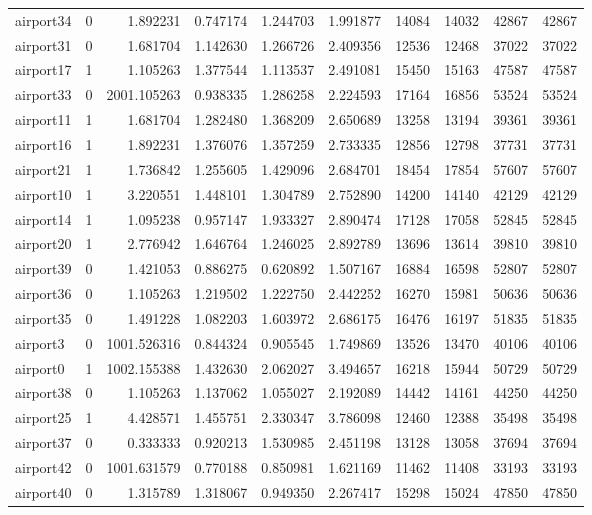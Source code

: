 \begin{longtable}{|l|r|r|r|r|r|r|r|r|r|}
airport34 & 0 & 1.892231 & 0.747174 & 1.244703 & 1.991877 & 14084 & 14032 & 42867 & 42867 \\
airport31 & 0 & 1.681704 & 1.142630 & 1.266726 & 2.409356 & 12536 & 12468 & 37022 & 37022 \\
airport17 & 1 & 1.105263 & 1.377544 & 1.113537 & 2.491081 & 15450 & 15163 & 47587 & 47587 \\
airport33 & 0 & 2001.105263 & 0.938335 & 1.286258 & 2.224593 & 17164 & 16856 & 53524 & 53524 \\
airport11 & 1 & 1.681704 & 1.282480 & 1.368209 & 2.650689 & 13258 & 13194 & 39361 & 39361 \\
airport16 & 1 & 1.892231 & 1.376076 & 1.357259 & 2.733335 & 12856 & 12798 & 37731 & 37731 \\
airport21 & 1 & 1.736842 & 1.255605 & 1.429096 & 2.684701 & 18454 & 17854 & 57607 & 57607 \\
airport10 & 1 & 3.220551 & 1.448101 & 1.304789 & 2.752890 & 14200 & 14140 & 42129 & 42129 \\
airport14 & 1 & 1.095238 & 0.957147 & 1.933327 & 2.890474 & 17128 & 17058 & 52845 & 52845 \\
airport20 & 1 & 2.776942 & 1.646764 & 1.246025 & 2.892789 & 13696 & 13614 & 39810 & 39810 \\
airport39 & 0 & 1.421053 & 0.886275 & 0.620892 & 1.507167 & 16884 & 16598 & 52807 & 52807 \\
airport36 & 0 & 1.105263 & 1.219502 & 1.222750 & 2.442252 & 16270 & 15981 & 50636 & 50636 \\
airport35 & 0 & 1.491228 & 1.082203 & 1.603972 & 2.686175 & 16476 & 16197 & 51835 & 51835 \\
airport3 & 0 & 1001.526316 & 0.844324 & 0.905545 & 1.749869 & 13526 & 13470 & 40106 & 40106 \\
airport0 & 1 & 1002.155388 & 1.432630 & 2.062027 & 3.494657 & 16218 & 15944 & 50729 & 50729 \\
airport38 & 0 & 1.105263 & 1.137062 & 1.055027 & 2.192089 & 14442 & 14161 & 44250 & 44250 \\
airport25 & 1 & 4.428571 & 1.455751 & 2.330347 & 3.786098 & 12460 & 12388 & 35498 & 35498 \\
airport37 & 0 & 0.333333 & 0.920213 & 1.530985 & 2.451198 & 13128 & 13058 & 37694 & 37694 \\
airport42 & 0 & 1001.631579 & 0.770188 & 0.850981 & 1.621169 & 11462 & 11408 & 33193 & 33193 \\
airport40 & 0 & 1.315789 & 1.318067 & 0.949350 & 2.267417 & 15298 & 15024 & 47850 & 47850 \\

\end{longtable}

